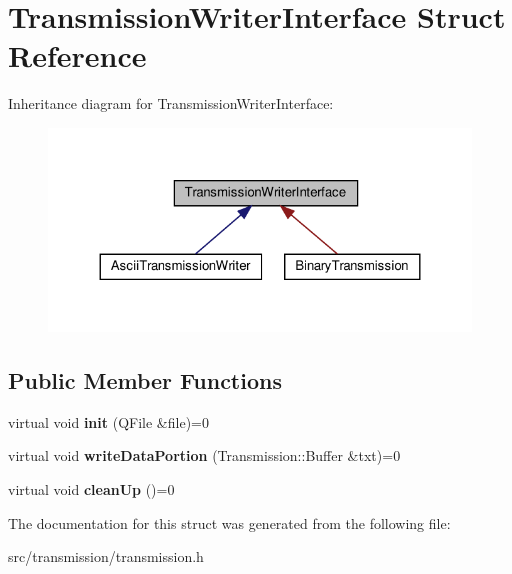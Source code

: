 \hypertarget{structTransmissionWriterInterface}{}\section{Transmission\+Writer\+Interface Struct Reference}
\label{structTransmissionWriterInterface}


Inheritance diagram for Transmission\+Writer\+Interface\+:
\nopagebreak
\begin{figure}[H]
\begin{center}
\leavevmode
\includegraphics[width=324pt]{structTransmissionWriterInterface__inherit__graph}
\end{center}
\end{figure}
\subsection*{Public Member Functions}
\begin{DoxyCompactItemize}
\item 
\mbox{\label{structTransmissionWriterInterface_a76a17827bd8e84439a48aaba1f6d6fea}} 
virtual void {\bfseries init} (Q\+File \&file)=0
\item 
\mbox{\label{structTransmissionWriterInterface_acf1a9771a553ce80b8d3bc2da8557b77}} 
virtual void {\bfseries write\+Data\+Portion} (Transmission\+::\+Buffer \&txt)=0
\item 
\mbox{\label{structTransmissionWriterInterface_af01959ecae8622bf4f1bf0ffe7732361}} 
virtual void {\bfseries clean\+Up} ()=0
\end{DoxyCompactItemize}


The documentation for this struct was generated from the following file\+:\begin{DoxyCompactItemize}
\item 
src/transmission/transmission.\+h\end{DoxyCompactItemize}
